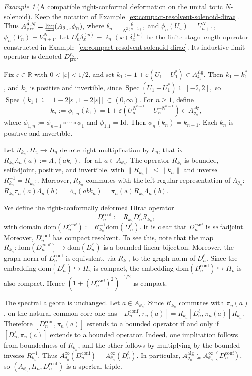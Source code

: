 \documentclass[11pt]{amsart}
\theoremstyle{definition}
\theoremstyle{remark}
\newtheorem{example}[theorem]{Example}
\newcommand{\id}{\mathrm{Id}}
\newcommand{\ex}{\mathrm{pro}}
\newcommand{\dom}{\mathrm{dom}}
\begin{document}
\begin{example}[A compatible right-conformal deformation on the unital toric \(N\)-solenoid]
\label{ex:solenoid-right-conformal}
Keep the notation of Example~\ref{ex:compact-resolvent-solenoid-dirac}. Thus $A_{\ex}^{\theta,N}=\varinjlim(A_{\theta_n},\phi_n),$ where
$\theta_n=\frac{\theta}{N^{2(n-1)}},$
and $\phi_n(U_n)=U_{n+1}^N,$
$\phi_n(V_n)=V_{n+1}^N.$ Let $D_n^\ell\delta_x^{(n)}=\ell_n(x)\delta_x^{(n)}$
be the finite-stage length operator constructed in
Example~\ref{ex:compact-resolvent-solenoid-dirac}. Its inductive-limit operator
is denoted $D_{\ex}^{\ell_N}.$

Fix $\varepsilon\in\mathbb R$ with $0<|\varepsilon|<1/2$, 
and set $k_1:=1+\varepsilon(U_1+U_1^*)\in A_{\theta_1}^{\mathrm{alg}}.$
Then $k_1=k_1^*$, and $k_1$ is positive and invertible, since $\operatorname{Spec}(U_1+U_1^*)\subseteq[-2,2],$
so $\operatorname{Spec}(k_1)\subseteq [1-2|\varepsilon|,1+2|\varepsilon|]
\subset (0,\infty).$
For \(n\geq1\), define
\[
k_n:=\phi_{1,n}(k_1)
=
1+\varepsilon\left(U_n^{N^{n-1}}+U_n^{-N^{n-1}}\right)
\in A_{\theta_n}^{\mathrm{alg}},
\]
where $\phi_{1,n}:=\phi_{n-1}\circ\cdots\circ\phi_1$ and $\phi_{1,1}=\id$. Then $\phi_n(k_n)=k_{n+1}.$
Each $k_n$ is positive and invertible.

Let $R_{k_n}:H_n\to H_n$ denote right multiplication by $k_n$, that is $R_{k_n}\Lambda_n(a):=\Lambda_n(ak_n),$ for all $a\in A_{\theta_n}$.
The operator $R_{k_n}$ is bounded, selfadjoint, positive, and invertible,
with $\|R_{k_n}\|\leq \|k_n\|$ and inverse
$R_{k_n}^{-1}=R_{k_n^{-1}}$. Moreover, $R_{k_n}$ commutes with the left regular
representation of $A_{\theta_n}$: $R_{k_n}\pi_n(a)\Lambda_n(b)=\Lambda_n(abk_n)=\pi_n(a)R_{k_n}\Lambda_n(b).$

We define the right-conformally deformed Dirac operator
\[
D_n^{\mathrm{conf}}
:=
R_{k_n}D_n^\ell R_{k_n},
\]
with domain $\dom(D_n^{\mathrm{conf}}):=R_{k_n}^{-1}\dom(D_n^\ell).$
It is clear that $D_n^{\mathrm{conf}}$ is selfadjoint. Moreover, $D_n^{\mathrm{conf}}$ has compact resolvent. To see this, note that the map $R_{k_n}\colon \dom(D_n^{\mathrm{conf}})\to \dom(D_n^\ell)$
is a bounded linear bijection. Moreover, the graph norm of
$D_n^{\mathrm{conf}}$ is equivalent, via $R_{k_n}$, to the graph norm of
$D_n^\ell$. Since the embedding $\dom(D_n^\ell)\hookrightarrow H_n$
is compact, the embedding $\dom(D_n^{\mathrm{conf}})\hookrightarrow H_n$
is also compact. Hence $(1+(D_n^{\mathrm{conf}})^2)^{-1/2}$
is compact.

The spectral algebra is unchanged. Let $a\in A_{\theta_n}$. Since
$R_{k_n}$ commutes with $\pi_n(a)$, on the natural common core one has $[D_n^{\mathrm{conf}},\pi_n(a)]=R_{k_n}[D_n^\ell,\pi_n(a)]R_{k_n}.$
Therefore $[D_n^{\mathrm{conf}},\pi_n(a)]$ extends to a bounded operator if and only if $[D_n^\ell,\pi_n(a)]$
extends to a bounded operator. Indeed, one implication follows from boundedness of
$R_{k_n}$, and the other follows by multiplying by the bounded inverse $R_{k_n}^{-1}$. Thus $A_{\theta_n}^{\infty}(D_n^{\mathrm{conf}})
=A_{\theta_n}^{\infty}(D_n^\ell).$
In particular, $A_{\theta_n}^{\mathrm{alg}}\subseteq A_{\theta_n}^{\infty}(D_n^{\mathrm{conf}}),$
so $(A_{\theta_n},H_n,D_n^{\mathrm{conf}})$
is a spectral triple.


\end{example}
\end{document}
